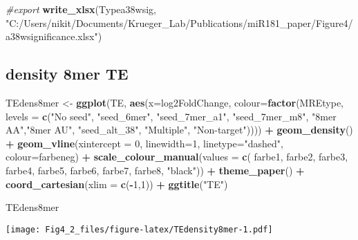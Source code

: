 \documentclass[
]{article}
\newenvironment{Shaded}{\begin{snugshade}}{\end{snugshade}}
\newcommand{\AttributeTok}[1]{\textcolor[rgb]{0.13,0.29,0.53}{#1}}
\newcommand{\CommentTok}[1]{\textcolor[rgb]{0.56,0.35,0.01}{\textit{#1}}}
\newcommand{\DecValTok}[1]{\textcolor[rgb]{0.00,0.00,0.81}{#1}}
\newcommand{\FunctionTok}[1]{\textcolor[rgb]{0.13,0.29,0.53}{\textbf{#1}}}
\newcommand{\NormalTok}[1]{#1}
\newcommand{\OtherTok}[1]{\textcolor[rgb]{0.56,0.35,0.01}{#1}}
\newcommand{\SpecialCharTok}[1]{\textcolor[rgb]{0.81,0.36,0.00}{\textbf{#1}}}
\newcommand{\StringTok}[1]{\textcolor[rgb]{0.31,0.60,0.02}{#1}}
\begin{document}
\begin{Shaded}
\begin{Highlighting}[]
\CommentTok{\#export}
\FunctionTok{write\_xlsx}\NormalTok{(Typea38wsig, }\StringTok{"C:/Users/nikit/Documents/Krueger\_Lab/Publications/miR181\_paper/Figure4/a38wsignificance.xlsx"}\NormalTok{)}
\end{Highlighting}
\end{Shaded}

\hypertarget{density-8mer-te}{%
\subsection{density 8mer TE}\label{density-8mer-te}}

\begin{Shaded}
\begin{Highlighting}[]
\NormalTok{TEdens8mer }\OtherTok{\textless{}{-}} \FunctionTok{ggplot}\NormalTok{(TE, }\FunctionTok{aes}\NormalTok{(}\AttributeTok{x=}\NormalTok{log2FoldChange, }\AttributeTok{colour=}\FunctionTok{factor}\NormalTok{(MREtype, }\AttributeTok{levels =} \FunctionTok{c}\NormalTok{(}\StringTok{"No seed"}\NormalTok{, }\StringTok{"seed\_6mer"}\NormalTok{, }\StringTok{"seed\_7mer\_a1"}\NormalTok{, }\StringTok{"seed\_7mer\_m8"}\NormalTok{, }\StringTok{"8mer AA"}\NormalTok{,}\StringTok{"8mer AU"}\NormalTok{, }\StringTok{"seed\_alt\_38"}\NormalTok{, }\StringTok{"Multiple"}\NormalTok{, }\StringTok{"Non{-}target"}\NormalTok{)))) }\SpecialCharTok{+}
  \FunctionTok{geom\_density}\NormalTok{() }\SpecialCharTok{+}
  \FunctionTok{geom\_vline}\NormalTok{(}\AttributeTok{xintercept =} \DecValTok{0}\NormalTok{, }\AttributeTok{linewidth=}\DecValTok{1}\NormalTok{, }\AttributeTok{linetype=}\StringTok{"dashed"}\NormalTok{, }\AttributeTok{colour=}\NormalTok{farbeneg) }\SpecialCharTok{+}
  \FunctionTok{scale\_colour\_manual}\NormalTok{(}\AttributeTok{values =} \FunctionTok{c}\NormalTok{( farbe1, farbe2, farbe3, farbe4, farbe5, farbe6, farbe7, farbe8, }\StringTok{"black"}\NormalTok{)) }\SpecialCharTok{+}
  \FunctionTok{theme\_paper}\NormalTok{() }\SpecialCharTok{+}
  \FunctionTok{coord\_cartesian}\NormalTok{(}\AttributeTok{xlim =} \FunctionTok{c}\NormalTok{(}\SpecialCharTok{{-}}\DecValTok{1}\NormalTok{,}\DecValTok{1}\NormalTok{)) }\SpecialCharTok{+}
  \FunctionTok{ggtitle}\NormalTok{(}\StringTok{"TE"}\NormalTok{)}

\NormalTok{TEdens8mer}
\end{Highlighting}
\end{Shaded}

\texttt{[image: Fig4\_2\_files/figure-latex/TEdensity8mer-1.pdf]}
\end{document}
